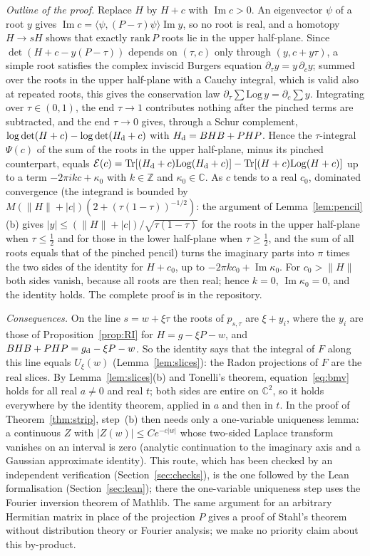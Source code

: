 \documentclass[11pt]{amsart}
\theoremstyle{definition}
\theoremstyle{remark}
\numberwithin{equation}{section}
\newcommand{\C}{\mathbb{C}}
\newcommand{\Z}{\mathbb{Z}}
\newcommand{\Tr}{\operatorname{Tr}}
\renewcommand{\Im}{\operatorname{Im}}
\begin{document}
\emph{Outline of the proof.} Replace $H$ by $H+c$ with $\Im c>0$. An eigenvector $\psi$ of a root $y$ gives
$\Im c=\langle\psi,(P-\tau)\psi\rangle\Im y$, so no root is real, and a homotopy $H\to sH$ shows that exactly
$\mathrm{rank}\,P$ roots lie in the upper half-plane. Since $\det(H+c-y(P-\tau))$ depends on $(\tau,c)$ only through
$(y,c+y\tau)$, a simple root satisfies the complex inviscid Burgers equation $\partial_\tau y=y\,\partial_cy$; summed
over the roots in the upper half-plane with a Cauchy integral, which is valid also at repeated roots, this gives the
conservation law $\partial_\tau\sum\mathrm{Log}\,y=\partial_c\sum y$. Integrating over $\tau\in(0,1)$, the end
$\tau\to1$ contributes nothing after the pinched terms are subtracted, and the end $\tau\to0$ gives, through a Schur
complement, $\log\det(H+c)-\log\det(H_{\rm d}+c)$ with $H_{\rm d}=BHB+PHP$. Hence the $\tau$-integral $\Psi(c)$ of the
sum of the roots in the upper half-plane, minus its pinched counterpart, equals
$\mathcal E(c)=\Tr[(H_{\rm d}+c)\mathrm{Log}(H_{\rm d}+c)]-\Tr[(H+c)\mathrm{Log}(H+c)]$ up to a term $-2\pi ikc+\kappa_0$
with $k\in\Z$ and $\kappa_0\in\C$. As $c$ tends to a real $c_0$, dominated convergence (the integrand is bounded by
$M(\|H\|+|c|)(2+(\tau(1-\tau))^{-1/2})$: the argument of Lemma~\ref{lem:pencil}(b) gives
$|y|\le(\|H\|+|c|)/\sqrt{\tau(1-\tau)}$ for the roots in the upper half-plane when $\tau\le\frac12$ and for those in
the lower half-plane when $\tau\ge\frac12$, and the sum of all roots equals that of the pinched pencil)
turns the imaginary parts into $\pi$ times the two sides of the identity for $H+c_0$, up to $-2\pi kc_0+\Im\kappa_0$.
For $c_0>\|H\|$ both sides vanish, because all roots are then real; hence $k=0$, $\Im\kappa_0=0$, and the identity
holds. The complete proof is in the repository\cite{repoOQP}.

\emph{Consequences.} On the line $s=w+\xi\tau$ the roots of $p_{s,\tau}$ are $\xi+y_i$, where the $y_i$ are those of
Proposition~\ref{prop:RI} for $H=g-\xi P-w$, and $BHB+PHP=g_{\rm d}-\xi P-w$. So the identity says that the integral of
$F$ along this line equals $U_\xi(w)$ (Lemma~\ref{lem:slices}): the Radon projections of $F$ are the real slices. By
Lemma~\ref{lem:slices}(b) and Tonelli's theorem, equation~\eqref{eq:bmv} holds for all real $a\ne0$ and real $t$; both
sides are entire on $\C^2$, so it holds everywhere by the identity theorem, applied in $a$ and then in $t$. In the proof
of Theorem~\ref{thm:strip}, step~(b) then needs only a one-variable uniqueness lemma: a continuous $Z$ with
$|Z(w)|\le Ce^{-c|w|}$ whose two-sided Laplace transform vanishes on an interval is zero (analytic continuation to the
imaginary axis and a Gaussian approximate identity). This route, which has been checked by an independent verification
(Section~\ref{sec:checks}), is the one followed by the Lean formalisation (Section~\ref{sec:lean}); there the
one-variable uniqueness step uses the Fourier inversion theorem of Mathlib. The same argument for an arbitrary Hermitian
matrix in place of the projection $P$ gives a proof of Stahl's theorem\cite{Stahl} without distribution theory or
Fourier analysis; we make no priority claim about this by-product.
\end{document}
